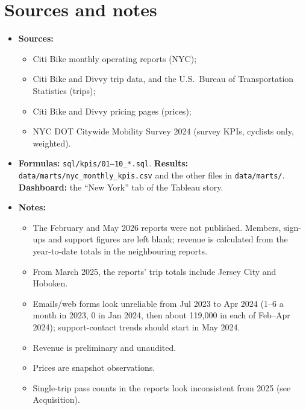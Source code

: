 \documentclass[11pt,a4paper]{article}
\newcommand{\f}[1]{\texttt{\small #1}}
\begin{document}
\section{Sources and notes}
\begin{itemize}
\item \textbf{Sources:}
  \begin{itemize}
  \item Citi Bike monthly operating reports (NYC);
  \item Citi Bike and Divvy trip data, and the U.S.\ Bureau of Transportation Statistics (trips);
  \item Citi Bike and Divvy pricing pages (prices);
  \item NYC DOT Citywide Mobility Survey 2024 (survey KPIs, cyclists only, weighted).
  \end{itemize}
\item \textbf{Formulas:} \f{sql/kpis/01--10\_*.sql}. \textbf{Results:} \f{data/marts/nyc\_monthly\_kpis.csv} and the other files in \f{data/marts/}. \textbf{Dashboard:} the ``New York'' tab of the Tableau story.
\item \textbf{Notes:}
  \begin{itemize}
  \item The February and May 2026 reports were not published. Members, sign-ups and support figures are left blank; revenue is calculated from the year-to-date totals in the neighbouring reports.
  \item From March 2025, the reports' trip totals include Jersey City and Hoboken.
  \item Emails/web forms look unreliable from Jul 2023 to Apr 2024 (1--6 a month in 2023, 0 in Jan 2024, then about 119,000 in each of Feb--Apr 2024); support-contact trends should start in May 2024.
  \item Revenue is preliminary and unaudited.
  \item Prices are snapshot observations.
  \item Single-trip pass counts in the reports look inconsistent from 2025 (see Acquisition).
  \end{itemize}
\end{itemize}
\end{document}
